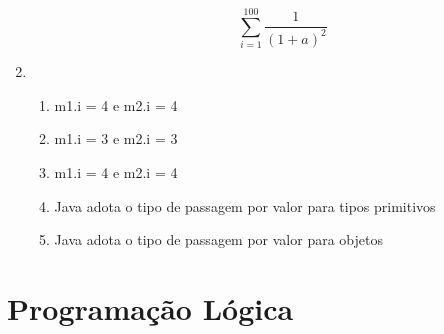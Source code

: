 \documentclass{article}
\begin{document}
\begin{enumerate}
\begin{enumerate}[label = (\alph*)]
                    \[
                        \sum_{i=1}^{100} \frac{1}{{(1 + a)}^2}
                    \]

          \end{enumerate}
    \item
          \begin{enumerate}[label = (\alph*)]
              \item
                    m1.i = 4 e m2.i = 4
              \item
                    m1.i = 3 e m2.i = 3
              \item
                    m1.i = 4 e m2.i = 4
              \item
                    Java adota o tipo de passagem por valor para tipos
                    primitivos
              \item
                    Java adota o tipo de passagem por valor para objetos
          \end{enumerate}

\end{enumerate}

\newpage

\section{Programação Lógica}
\end{document}
